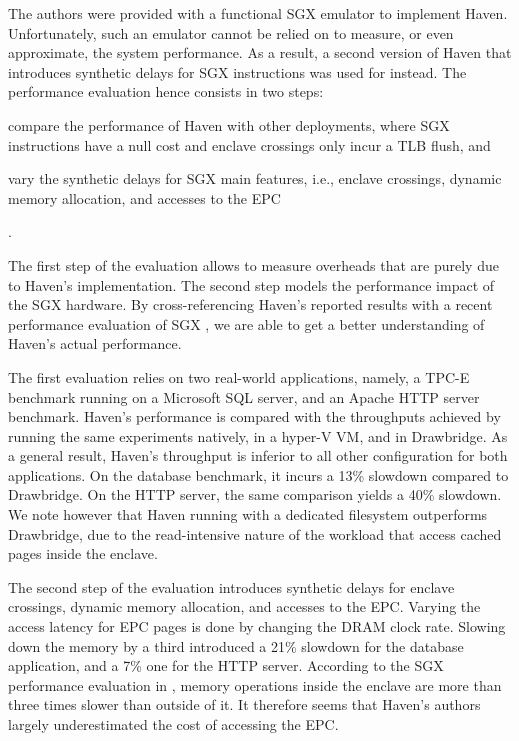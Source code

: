 The authors were provided with a functional SGX emulator to implement Haven.
Unfortunately, such an emulator cannot be relied on to measure, or even approximate, the system performance.
As a result, a second version of Haven that introduces synthetic delays for SGX instructions was used for instead.
The performance evaluation hence consists in two steps:
\begin{enumerate*}
	\item compare the performance of Haven with other deployments, where SGX instructions have a null cost and enclave crossings only incur a TLB flush, and
	\item vary the synthetic delays for SGX main features, i.e., enclave crossings, dynamic memory allocation, and accesses to the EPC
\end{enumerate*}.

The first step of the evaluation allows to measure overheads that are purely due to Haven's implementation.
The second step models the performance impact of the SGX hardware.
By cross-referencing Haven's reported results with a recent performance evaluation of SGX \cite{DBLP:conf/IEEEwisa/ZhaoSTZX16}, we are able to get a better understanding of Haven's actual performance.

The first evaluation relies on two real-world applications, namely, a TPC-E benchmark running on a Microsoft SQL server, and an Apache HTTP server benchmark.
Haven's performance is compared with the throughputs achieved by running the same experiments natively, in a hyper-V VM, and in Drawbridge.
As a general result, Haven's throughput is inferior to all other configuration for both applications.
On the database benchmark, it incurs a 13\% slowdown compared to Drawbridge.
On the HTTP server, the same comparison yields a 40\% slowdown.
We note however that Haven running with a dedicated filesystem outperforms Drawbridge, due to the read-intensive nature of the workload that access cached pages inside the enclave.

The second step of the evaluation introduces synthetic delays for enclave crossings, dynamic memory allocation, and accesses to the EPC.
Varying the access latency for EPC pages is done by changing the DRAM clock rate.
Slowing down the memory by a third introduced a 21\% slowdown for the database application, and a 7\% one for the HTTP server.
According to the SGX performance evaluation in \cite{DBLP:conf/IEEEwisa/ZhaoSTZX16}, memory operations inside the enclave are more than three times slower than outside of it.
It therefore seems that Haven's authors largely underestimated the cost of accessing the EPC.

